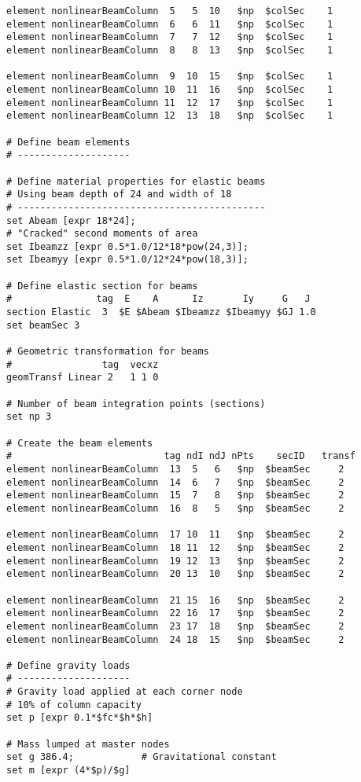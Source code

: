 \documentclass[12pt]{article}
\begin{document}
{\begin{verbatim}
element nonlinearBeamColumn  5   5  10   $np  $colSec    1
element nonlinearBeamColumn  6   6  11   $np  $colSec    1
element nonlinearBeamColumn  7   7  12   $np  $colSec    1
element nonlinearBeamColumn  8   8  13   $np  $colSec    1

element nonlinearBeamColumn  9  10  15   $np  $colSec    1
element nonlinearBeamColumn 10  11  16   $np  $colSec    1
element nonlinearBeamColumn 11  12  17   $np  $colSec    1
element nonlinearBeamColumn 12  13  18   $np  $colSec    1

# Define beam elements
# --------------------

# Define material properties for elastic beams
# Using beam depth of 24 and width of 18
# --------------------------------------------
set Abeam [expr 18*24];
# "Cracked" second moments of area
set Ibeamzz [expr 0.5*1.0/12*18*pow(24,3)];
set Ibeamyy [expr 0.5*1.0/12*24*pow(18,3)];

# Define elastic section for beams
#               tag  E    A      Iz       Iy     G   J
section Elastic  3  $E $Abeam $Ibeamzz $Ibeamyy $GJ 1.0
set beamSec 3

# Geometric transformation for beams
#                tag  vecxz
geomTransf Linear 2   1 1 0

# Number of beam integration points (sections)
set np 3

# Create the beam elements
#                           tag ndI ndJ nPts    secID   transf
element nonlinearBeamColumn  13  5   6   $np  $beamSec     2
element nonlinearBeamColumn  14  6   7   $np  $beamSec     2
element nonlinearBeamColumn  15  7   8   $np  $beamSec     2
element nonlinearBeamColumn  16  8   5   $np  $beamSec     2

element nonlinearBeamColumn  17 10  11   $np  $beamSec     2
element nonlinearBeamColumn  18 11  12   $np  $beamSec     2
element nonlinearBeamColumn  19 12  13   $np  $beamSec     2
element nonlinearBeamColumn  20 13  10   $np  $beamSec     2

element nonlinearBeamColumn  21 15  16   $np  $beamSec     2
element nonlinearBeamColumn  22 16  17   $np  $beamSec     2
element nonlinearBeamColumn  23 17  18   $np  $beamSec     2
element nonlinearBeamColumn  24 18  15   $np  $beamSec     2

# Define gravity loads
# --------------------
# Gravity load applied at each corner node
# 10% of column capacity
set p [expr 0.1*$fc*$h*$h]

# Mass lumped at master nodes
set g 386.4;            # Gravitational constant
set m [expr (4*$p)/$g]


\end{verbatim}}
\end{document}
